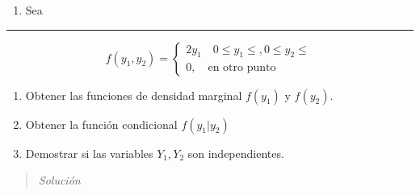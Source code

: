 \documentclass[
  letterpaper,
  DIV=11,
  numbers=noendperiod]{scrartcl}
\providecommand{\tightlist}{%
  \setlength{\itemsep}{0pt}\setlength{\parskip}{0pt}}\usepackage{longtable,booktabs,array}
\begin{document}
\begin{enumerate}
\def\labelenumi{\arabic{enumi}.}
\setcounter{enumi}{5}
\tightlist
\item
  Sea
\end{enumerate}

\begin{center}\rule{0.5\linewidth}{0.5pt}\end{center}

\[
  f(y_1, y_2) = \begin{cases}
    2y_1\quad 0 \leq y_1 \leq, 0 \leq y_2 \leq\\
    0,\quad \text{en otro punto}
  \end{cases}
\]

\begin{enumerate}
\def\labelenumi{\alph{enumi})}
\tightlist
\item
  Obtener las funciones de densidad marginal \(f(y_1)\) y \(f(y_2)\).
\item
  Obtener la función condicional \(f(y_1 | y_2)\)
\item
  Demostrar si las variables \(Y_1, Y_2\) son independientes.
\end{enumerate}

\begin{quote}
\emph{Solución}
\end{quote}
\end{document}
